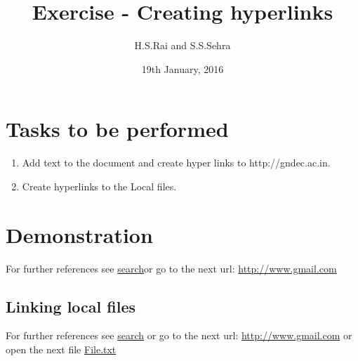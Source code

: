 \documentclass[a4paper,12pt,twoside]{article}
\title{Exercise - Creating hyperlinks}
\author{H.S.Rai and S.S.Sehra}
\date{19th January, 2016}
\begin{document}
	\maketitle	
	\section*{Tasks to be performed}
	\begin{enumerate}	
		\item Add text to the document and create hyper links to http://gndec.ac.in.
		\item Create hyperlinks to the Local files.
	\end{enumerate}
	
		\section*{Demonstration}
		For further references see \href{http://www.google.com} {search}or go to the next url: \url{http://www.gmail.com}
		
		\subsection*{Linking local files}
		For further references see \href{http://www.google.com} {search}
		or go to the next url: \url{http://www.gmail.com} or open the next
		file \href{run:./file.txt}{File.txt}
\end{document}
